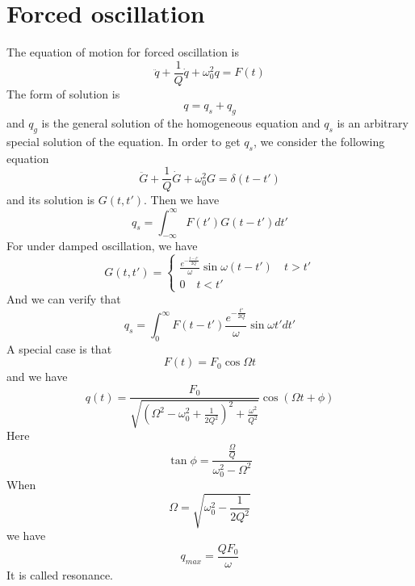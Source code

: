 \documentclass[cyan]{elegantnote}
\begin{document}
\section{Forced oscillation}
The equation of motion for forced oscillation is
\[\ddot{q} + \frac{1}{Q}\dot{q} + \omega_0^2 q = F(t)\]
The form of solution is
\[q = q_s + q_g\]
and $q_g$ is the general solution of the homogeneous equation and $q_s$ is an arbitrary special solution of the equation. In order to get $q_s$, we consider the following equation
\[\ddot{G} + \frac{1}{Q}\dot{G} + \omega_0^2 G = \delta(t-t')\]
and its solution is $G(t,t')$.
Then we have
\[q_s = \int_{-\infty}^{\infty} F(t')G(t-t')dt'\]
For under damped oscillation, we have
\[G(t,t') = \begin{cases} \frac{e^{-\frac{t-t'}{2Q}}}{\omega} \sin\omega(t-t') \quad t>t'\\ 0 \quad t<t'\end{cases} \]
And we can verify that
\[q_s = \int_{0}^{\infty} F(t-t') \frac{e^{-\frac{t'}{2Q}}}{\omega} \sin\omega t' dt'\]
A special case is that
\[F(t) = F_0 \cos\Omega t\]
and we have
\[q(t) = \frac{F_0}{\sqrt{(\Omega^2 - \omega_0^2 + \frac{1}{2Q^2})^2 + \frac{\omega^2}{Q^2}}} \cos(\Omega t + \phi)\]
Here
\[\tan \phi = \frac{\frac{\Omega}{Q}}{\omega_0^2 - \Omega^2}\]
When
\[\Omega = \sqrt{\omega_0^2 - \frac{1}{2Q^2}}\]
we have
\[q_{max} = \frac{QF_0}{\omega}\]
It is called resonance. 
\end{document}
